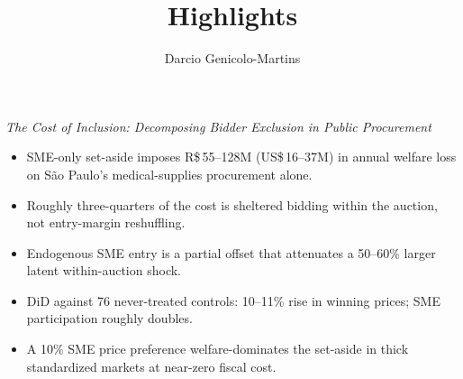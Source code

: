 \documentclass[11pt]{article}
\title{Highlights}
\author{Darcio Genicolo-Martins}
\date{}
\begin{document}
\maketitle
\noindent\textit{The Cost of Inclusion: Decomposing Bidder Exclusion in Public Procurement}

\bigskip

\begin{itemize}
\item SME-only set-aside imposes R\$\,55--128M (US\$\,16--37M) in annual welfare loss on S\~ao Paulo's medical-supplies procurement alone.
\item Roughly three-quarters of the cost is sheltered bidding within the auction, not entry-margin reshuffling.
\item Endogenous SME entry is a partial offset that attenuates a 50--60\% larger latent within-auction shock.
\item DiD against 76 never-treated controls: 10--11\% rise in winning prices; SME participation roughly doubles.
\item A 10\% SME price preference welfare-dominates the set-aside in thick standardized markets at near-zero fiscal cost.
\end{itemize}
\end{document}
